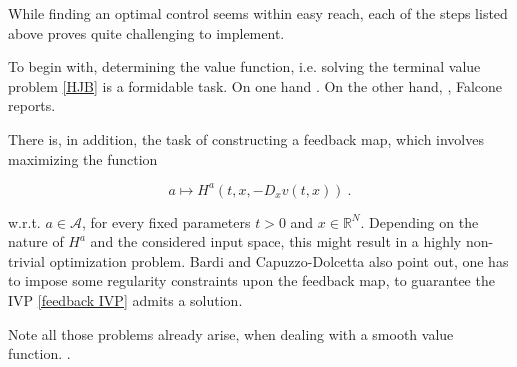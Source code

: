 While finding an optimal control seems within easy reach, each of the steps listed above proves quite challenging to implement.

To begin with, determining the value function, i.e. solving the terminal value problem \eqref{HJB} is a formidable task. On one hand  \cite{zhou}. On the other hand, , Falcone \cite{bardi2008optimal} reports.

There is, in addition, the task of constructing a feedback map, which involves maximizing the function

\begin{equation*}
	a \mapsto H^{a}(t, x, -D_x v(t, x)) \ .
\end{equation*}

w.r.t. $ a \in \mathcal{A} $, for every fixed parameters $ t > 0 $ and $ x \in \mathbb{R}^N $. Depending on the nature of $ H^{a} $ and the considered input space, this might result in a highly non-trivial optimization problem. Bardi and Capuzzo-Dolcetta \cite{bardi2008optimal} also point out, one has to impose some regularity constraints upon the feedback map, to guarantee the IVP \eqref{feedback IVP} admits a solution.

Note all those problems already arise, when dealing with a smooth value function.  \cite{bardi2008optimal}.


